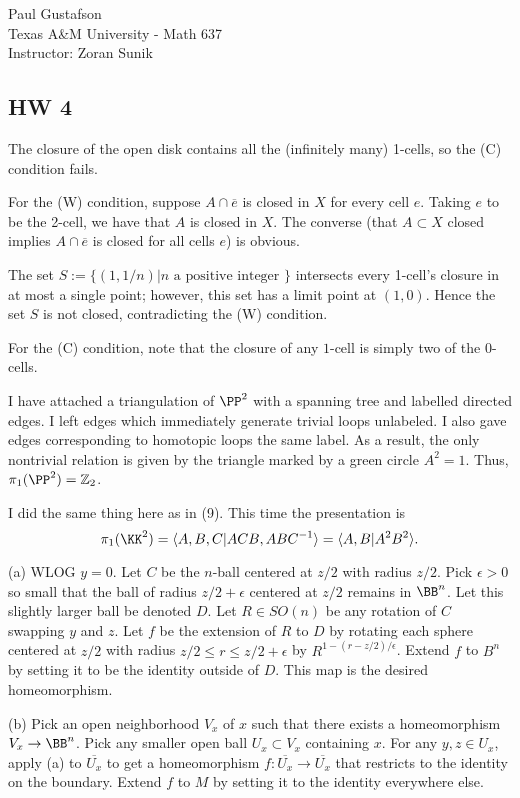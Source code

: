 \documentclass{article}
\begin{document}
\noindent Paul Gustafson\\   
\noindent Texas A\&M University - Math 637\\ 
\noindent Instructor: Zoran Sunik

\subsection*{HW 4}
 The closure of the open disk contains all the (infinitely many) 1-cells, so the (C) condition fails. 

For the (W) condition, suppose $A \cap \overline{e}$ is closed in $X$ for every cell $e$. Taking $e$ to be the 2-cell, we have that $A$ is closed in $X$.
The converse (that $A \subset X$ closed implies $A \cap \overline{e}$ is closed for all cells $e$) is obvious.

 The set $S := \{(1,1/n) \vert n \text{ a positive integer } \}$ intersects every 1-cell's closure in at most a single point; however, this set has a limit point at $(1,0)$.  Hence the set $S$ is not closed, contradicting the (W) condition.

For the (C) condition, note that the closure of any $1$-cell is simply two of the $0$-cells.

 I have attached a triangulation of $\PP^2$ with a spanning tree and labelled directed edges.  I left edges which immediately generate trivial loops unlabeled. I also gave edges corresponding to homotopic loops the same label. As a result, the only nontrivial relation is given by the triangle marked by a green circle $A^2 = 1$. Thus, $\pi_1(\PP^2) = \Z_2$.

 I did the same thing here as in (9).  This time the presentation is
$$ \pi_1(\KK^2) = \langle A,B,C \vert ACB, ABC^{-1} \rangle = \langle A,B \vert A^2B^2 \rangle.$$

 (a) WLOG $y = 0$.  Let $C$ be the $n$-ball centered at $z/2$ with radius $z/2$. Pick $\epsilon > 0$ so small that the ball of radius $z/2 + \epsilon$ centered at $z/2$ remains in $\BB^n$. Let this slightly larger ball be denoted $D$.  Let $R \in SO(n)$ be any rotation of $C$ swapping $y$ and $z$.  Let $f$ be the extension of $R$ to $D$ by rotating each sphere centered at $z/2$ with radius $z/2 \le r \le z/2 + \epsilon$ by $R^{1 - (r - z/2)/\epsilon}$. Extend $f$ to $B^n$ by setting it to be the identity outside of $D$.  This map is the desired homeomorphism.

(b) Pick an open neighborhood $V_x$ of $x$ such that there exists a homeomorphism $V_x \to \BB^n$.  Pick any smaller open ball $U_x  \subset V_x$ containing $x$.  For any $y,z \in U_x$, apply (a) to $\overline{U_x}$ to get a homeomorphism $f: \overline{U_x} \to \overline{U_x}$ that restricts to the identity on the boundary.  Extend $f$ to $M$ by setting it to the identity everywhere else.
\end{document}
